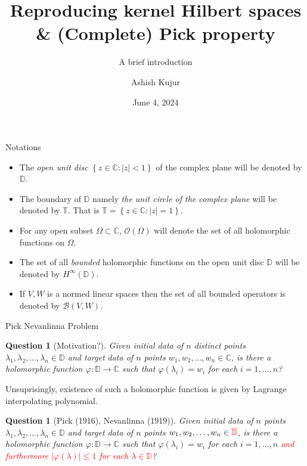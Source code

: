 \documentclass[handout]{beamer}
\title{Reproducing kernel Hilbert spaces \&  (Complete) Pick property}
\subtitle{A brief introduction}
\author{Ashish Kujur}
\institute{Indian Institute of Science Education and Research, Thiruvananthapuram}
\date{June 4, 2024}
\newtheorem{question}[theorem]{Question}
\newcommand{\C}{\mathbb C}
\newcommand{\D}{\mathbb D}
\newcommand{\T}{\mathbb T}
\newcommand{\calB}{{\mathcal B}}
\newcommand{\calO}{{\mathcal O}}
\newcommand{\abs}[1]{\left\lvert #1 \right\rvert}
\begin{document}
 \begin{frame}
   \maketitle
 \end{frame}

 \begin{frame}{Notations}
\begin{itemize}
\item The \textit{open unit disc} $\left\{ z\in \C : \abs{z} < 1 \right\}$ of the complex plane will be denoted by $\D$.
\item The boundary of $\D$ namely \textit{the unit circle of the complex plane} will be denoted by $\T$. That is $\T = \left\{ z \in \C : \abs{z} = 1 \right\}$. 
\item For any open subset $\Omega \subset \C$, $\calO \left( \Omega \right)$ will denote the set of all holomorphic functions on $\Omega$.
\item The set of all \textit{bounded} holomorphic functions on the open unit disc $\D$ will be denoted by $H^{\infty} \left( \D \right)$.
\item If $V,W$ is a normed linear spaces then the set of all bounded operators is denoted by $\calB \left( V, W \right)$.
\end{itemize}
 \end{frame}

\begin{frame}{Pick Nevanlinna Problem}
\begin{question}[Motivation?]
Given \textit{initial data} of $n$ distinct points $\lambda_{1}, \lambda_{2}, \ldots , \lambda_{n} \in \D$ and \textit{target data} of $n$ points $w_{1}, w_{2}, \ldots , w_{n} \in \C$, is there a \textit{holomorphic} function $\varphi : \D \to \C$ such that $\varphi \left( \lambda_{i} \right) = w_{i}$ for each $i=1, \ldots, n$?
\end{question}
\pause
Unsuprisingly, existence of such a holomorphic function is given by Lagrange interpolating polynomial.
\pause
\begin{question}[Pick (1916), Nevanlinna (1919)]
Given \textit{initial data} of $n$ points $\lambda_{1}, \lambda_{2}, \ldots , \lambda_{n} \in \D$ and \textit{target data} of $n$ points $w_{1}, w_{2}, \ldots , w_{n} \in \textcolor{red}{\overline{\D}}$, is there a \textit{holomorphic} function $\varphi : \D \to \C$ such that $\varphi \left( \lambda_{i} \right) = w_{i}$ for each $i=1, \ldots, n$ \textcolor{red}{and furthermore $\abs{\varphi \left( \lambda \right)} \le 1$ for each $\lambda \in \D$}?
\end{question}
\end{frame}
\end{document}
